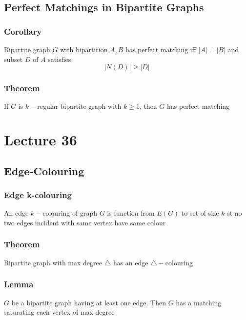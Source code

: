 \documentclass[11pt]{article}
\begin{document}
\subsection{Perfect Matchings in Bipartite Graphs}
\subsubsection*{Corollary}
Bipartite graph $G$ with bipartition $A,B$ has perfect matching iff $|A|=|B|$ and subset $D$ of $A$ satisfies 
\[|N(D)|\geq|D|\]
\subsubsection*{Theorem}
If $G$ is $k-$regular bipartite graph with $k\geq1$, then $G$ has perfect matching 

\section{Lecture 36}
\subsection{Edge-Colouring}
\subsubsection*{Edge k-colouring}
An edge $k-$colouring of graph $G$ is function from $E(G)$ to set of size $k$ st no two edges incident with same vertex have same colour
\subsubsection*{Theorem}
Bipartite graph with max degree $\triangle$ has an edge $\triangle-$colouring
\subsubsection*{Lemma}
$G$ be a bipartite graph having at least one edge. Then $G$ has a matching saturating each vertex of max degree 
\end{document}
